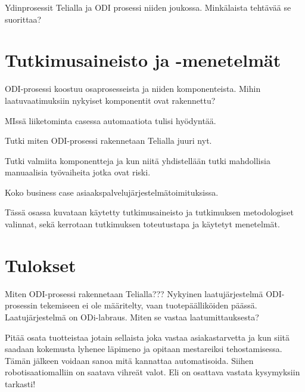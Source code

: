 \documentclass[finnish,12pt,a4paper,pdftex]{article}
\begin{document}
Ydinprosessit Telialla ja ODI prosessi niiden joukossa. Minkälaista tehtävää se suorittaa?










\clearpage

\section{Tutkimusaineisto ja -menetelmät}

ODI-prosessi koostuu osaprosesseista ja niiden komponenteista. Mihin laatuvaatimuksiin nykyiset komponentit ovat rakennettu?



MIssä liiketominta casessa automaatiota tulisi hyödyntää. 

Tutki miten ODI-prosessi rakennetaan Telialla juuri nyt.

Tutki valmiita komponentteja ja kun niitä yhdistellään tutki mahdollisia manuaalisia työvaiheita jotka ovat riski.

Koko business case asiaakspalvelujärjestelmätoimituksissa.

Tässä osassa kuvataan käytetty tutkimusaineisto ja
tutkimuksen metodologiset valinnat, sekä
kerrotaan tutkimuksen toteutustapa ja käytetyt menetelmät. 

\clearpage

\section{Tulokset}
Miten ODI-prosessi rakennetaan Telialla???
Nykyinen laatujärjestelmä ODI-prosessin tekemiseen ei ole määritelty, vaan tuotepäälliköiden päässä.
Laatujärjestelmä on ODi-labraus. Miten se vastaa laatumittauksesta?

Pitää osata tuotteistaa jotain sellaista joka vastaa asiakastarvetta ja kun siitä saadaan kokemusta lyhenee läpimeno ja opitaan mestareiksi tehostamisessa. Tämän jälkeen voidaan sanoa mitä kannattaa automatisoida. Siihen robotisaatiomalliin on saatava vihreät valot. Eli on osattava vastata kysymyksiin tarkasti!
\end{document}
